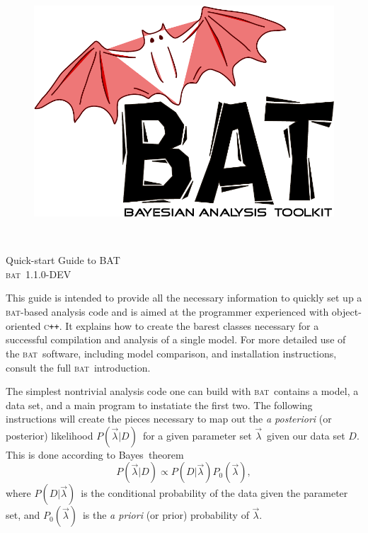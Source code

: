 \documentclass[a4paper,11pt]{article}
\newcommand{\acronym}[1]{\textsc{#1}}
\newcommand{\BAT}{\acronym{bat}}
\newcommand{\C}{\textsc{c}}
\newcommand{\CPP}{\C\texttt{++}}
\newcommand{\BProb}[2]{\ensuremath{P(#1|#2)}}
\newcommand{\BPars}{\ensuremath{\vec{\lambda}}}
\newcommand{\BData}{\ensuremath{D}}
\newcommand{\BPrior}{\ensuremath{P_0(\BPars)}}
\newcommand{\BPosterior}{\BProb{\BPars}{\BData}}
\newcommand{\BConditional}{\BProb{\BData}{\BPars}}
\begin{document}

\begin{figure}[t]
\includegraphics[scale=0.25]{bat}
\end{figure}
\quad\\
\vspace{2\baselineskip}

\begin{center}
  {\Large Quick-start Guide to BAT}\\
  \vspace{1\baselineskip}
  {\large \BAT\ 1.1.0-DEV}
\end{center}

\vspace{4\baselineskip}

This guide is intended to provide all the necessary information to
quickly set up a \BAT-based analysis code and is aimed at the
programmer experienced with object-oriented \CPP. It explains how to
create the barest classes necessary for a successful compilation and
analysis of a single model. For more detailed use of the \BAT\
software, including model comparison, and installation instructions,
consult the full \BAT\ introduction.

The simplest nontrivial analysis code one can build with \BAT\
contains a model, a data set, and a main program to instatiate the
first two. The following instructions will create the pieces necessary
to map out the \emph{a posteriori} (or posterior) likelihood
\BPosterior\ for a given parameter set \BPars\ given our data set
\BData.  This is done according to Bayes\ theorem
\begin{displaymath}
  \BPosterior \propto \BConditional\BPrior,
\end{displaymath}
where \BConditional\ is the conditional probability of the data given
the parameter set, and \BPrior\ is the \emph{a priori} (or prior)
probability of \BPars.
\end{document}

